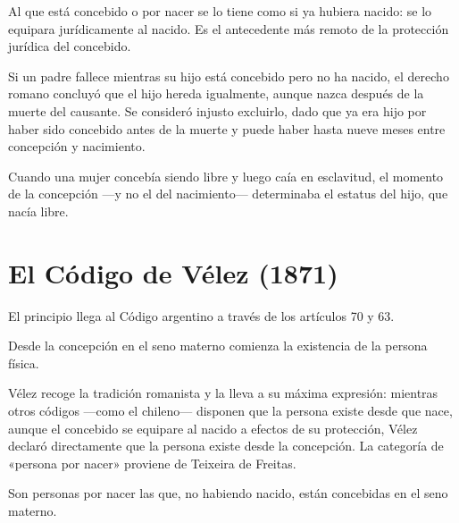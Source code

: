 \documentclass[12pt,oneside]{book}
\begin{document}
\begin{definicion}
Al que está concebido o por nacer se lo tiene como si ya hubiera nacido: se lo equipara jurídicamente al nacido. Es el antecedente más remoto de la protección jurídica del concebido.
\end{definicion}

\begin{ejemplo}
Si un padre fallece mientras su hijo está concebido pero no ha nacido, el derecho romano concluyó que el hijo hereda igualmente, aunque nazca después de la muerte del causante. Se consideró injusto excluirlo, dado que ya era hijo por haber sido concebido antes de la muerte y puede haber hasta nueve meses entre concepción y nacimiento.
\end{ejemplo}

\begin{ejemplo}
Cuando una mujer concebía siendo libre y luego caía en esclavitud, el momento de la concepción ---y no el del nacimiento--- determinaba el estatus del hijo, que nacía libre.
\end{ejemplo}

\section{El Código de Vélez (1871)}

El principio llega al Código argentino a través de los artículos 70 y 63.

\begin{nota}
Desde la concepción en el seno materno comienza la existencia de la persona física.
\end{nota}

Vélez recoge la tradición romanista y la lleva a su máxima expresión: mientras otros códigos ---como el chileno--- disponen que la persona existe desde que nace, aunque el concebido se equipare al nacido a efectos de su protección, Vélez declaró directamente que la persona existe desde la concepción. La categoría de «persona por nacer» proviene de Teixeira de Freitas.

\begin{nota}
Son personas por nacer las que, no habiendo nacido, están concebidas en el seno materno.
\end{nota}
\end{document}
